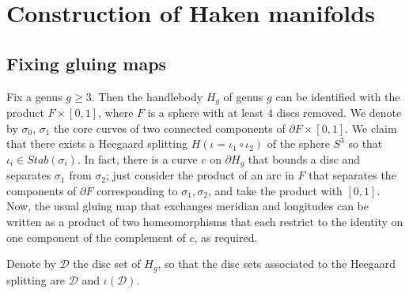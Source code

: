 \documentclass[11pt, oneside]{amsart}
\theoremstyle{definition}
\theoremstyle{definition}
\newcommand{\calD} {\ensuremath {\mathcal{D}}}
\begin{document}
\section{Construction of Haken manifolds}
\label{sec:constr}


 \subsection{Fixing gluing maps}
 
 Fix a genus $g\geq 3$. Then the handlebody $H_g$ of genus $g$ can be identified with the product $F\times [0,1]$, where $F$ is a sphere with at least $4$ discs removed. We denote by $\sigma_0$, $\sigma_1$ the core curves of two connected components of $\partial F\times[0,1]$. We claim that there exists a Heegaard splitting $H(\iota=\iota_1\circ\iota_2)$ of the sphere $S^3$ so that $\iota_i\in Stab(\sigma_i)$. In fact, there is a curve $c$ on $\partial H_g$ that bounds a disc and separates $\sigma_1$ from $\sigma_2$; just consider the product of an arc in $F$ that separates the components of $\partial F$ corresponding to $\sigma_1,\sigma_2$, and take the product with $[0,1]$. Now, the usual gluing map that exchanges meridian and longitudes can be written as a product of two homeomorphisms that each restrict to the identity on one component of the complement of $c$, as required.
 
 Denote by $\calD$ the disc set of $H_g$, so that the disc sets associated to the Heegaard splitting are $\calD$ and $\iota(\calD)$.
 
%  
 
\end{document}
